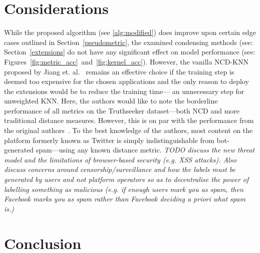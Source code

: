 \documentclass[preprint,12pt]{elsarticle}
\newcommand{\cm}[1]{\textit{{\color{blue}#1}}}
\begin{document}
\section{Considerations}
\label{considerations}
While the proposed algorithm (see \ref{alg:modified}) does improve upon certain edge cases outlined in Section~\ref{pseudometric}, the examined condensing methods (see: Section~\ref{extensions} do not have any significant effect on model performance (see: Figures~\ref{fig:metric_acc}~and~\ref{fig:kernel_acc}). 
However, the vanilla NCD-KNN proposed by Jiang et. al.~\cite{jiang2022less} remains an effective choice if the training step is deemed too expensive for the chosen applications and the only reason to deploy the extensions would be to reduce the training time--- an unnecessary step for unweighted KNN. 
Here, the authors would like to note the borderline performance of all metrics on the Truthseeker dataset---both NCD and more traditional distance measures. 
However, this is on par with the performance from the original authors~\cite{truthseeker}. 
To the best knowledge of the authors, most content on the platform formerly known as Twitter is simply indistinguishable from bot-generated spam---using any known distance metric. 
\cm{TODO discuss the new threat model  and the limitations of browser-based security (e.g. XSS attacks). Also discuss concerns around censorship/surveillance and how the labels must be generated by users and not platform operators so as to decentralise the power of labelling something as malicious (e.g. if enough users mark you as spam, then Facebook marks you as spam rather than Facebook deciding a priori what spam is.)}
\section{Conclusion}
\label{conclusion}
\end{document}
